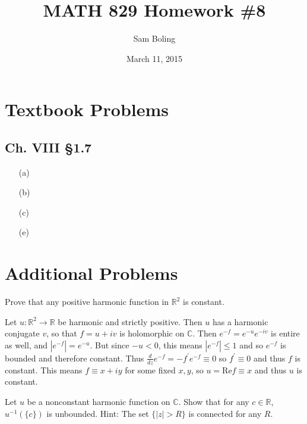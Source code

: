 \documentclass{article}
\title{MATH 829 Homework \#8}
\date{March 11, 2015}
\author{Sam Boling}
\newcounter{Problem}
\newenvironment{Problem}{\begin{Exercise}[name={Problem},
                                          counter={Problem}]}
                        {\end{Exercise}}
\begin{document}
\begin{titlepage}
\maketitle
\end{titlepage}

\section{Textbook Problems}
\subsection*{Ch. VIII \S 1.7}
\begin{itemize}
  \item[(a)]{}
  \item[(b)]{}
  \item[(c)]{}
  \item[(e)]{}
\end{itemize}

\section{Additional Problems}
\begin{Problem}
Prove that any positive harmonic function in $\mathbb{R}^2$ is constant.
\end{Problem}

\begin{Answer}
Let $u : \mathbb{R}^2 \to \mathbb{R}$ be harmonic and strictly
positive. Then $u$ has a harmonic conjugate $v$, so that
$f = u + i v$ is holomorphic on $\mathbb{C}$. Then
$e^{-f} = e^{-u} e^{-iv}$ is entire as well, and $|e^{-f}| = e^{-u}$.
But since $-u < 0$, this means $|e^{-f}| \leq 1$ and so $e^{-f}$
is bounded and therefore constant. Thus
$\frac{d}{dz} e^{-f} = -f^\prime e^{-f} \equiv 0$  so $f^\prime \equiv
0$ and thus $f$ is constant. This means $f \equiv x + i y$ for some
fixed $x, y$, so $u = \mathrm{Re} f \equiv x$ and thus $u$ is constant.
\end{Answer}

\begin{Problem}
Let $u$ be a nonconstant harmonic function on $\mathbb{C}$. Show that
for any $c \in \mathbb{R}$, $u^{-1}(\{ c \})$ is unbounded.
Hint: The set $\{ |z| > R \}$ is connected for any $R$.
\end{Problem}
\end{document}
